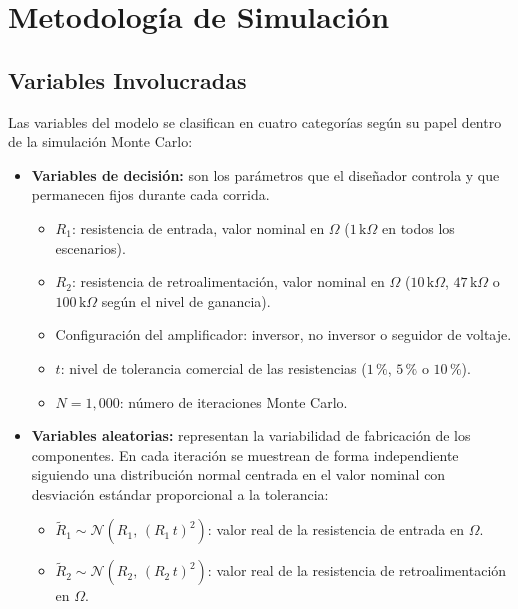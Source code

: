 ﻿\documentclass[12pt, letterpaper]{article}
\begin{document}
\newpage
\section{Metodología de Simulación}

\subsection{Variables Involucradas}

Las variables del modelo se clasifican en cuatro categorías según su papel dentro
de la simulación Monte Carlo:

\begin{itemize}[leftmargin=2em]

    \item \textbf{Variables de decisión:}
          son los parámetros que el diseñador controla y que permanecen fijos
          durante cada corrida.

          \begin{itemize}[leftmargin=2em]
              \item \(R_1\): resistencia de entrada, valor nominal en \(\Omega\)
                    (\(1\,\text{k}\Omega\) en todos los escenarios).
              \item \(R_2\): resistencia de retroalimentación, valor nominal en
                    \(\Omega\) (\(10\,\text{k}\Omega\), \(47\,\text{k}\Omega\) o
                    \(100\,\text{k}\Omega\) según el nivel de ganancia).
              \item Configuración del amplificador: inversor, no inversor o
                    seguidor de voltaje.
              \item \(t\): nivel de tolerancia comercial de las resistencias
                    (\(1\,\text{\%}\), \(5\,\text{\%}\) o \(10\,\text{\%}\)).
              \item \(N = 1{,}000\): número de iteraciones Monte Carlo.
          \end{itemize}

    \item \textbf{Variables aleatorias:}
          representan la variabilidad de fabricación de los componentes. En cada
          iteración se muestrean de forma independiente siguiendo una distribución
          normal centrada en el valor nominal con desviación estándar proporcional
          a la tolerancia:

          \begin{itemize}[leftmargin=2em]
              \item \(\tilde{R}_1 \sim \mathcal{N}\!\left(R_1,\,(R_1\, t)^2\right)\):
                    valor real de la resistencia de entrada en \(\Omega\).
              \item \(\tilde{R}_2 \sim \mathcal{N}\!\left(R_2,\,(R_2\, t)^2\right)\):
                    valor real de la resistencia de retroalimentación en \(\Omega\).
          \end{itemize}


\end{itemize}
\end{document}

